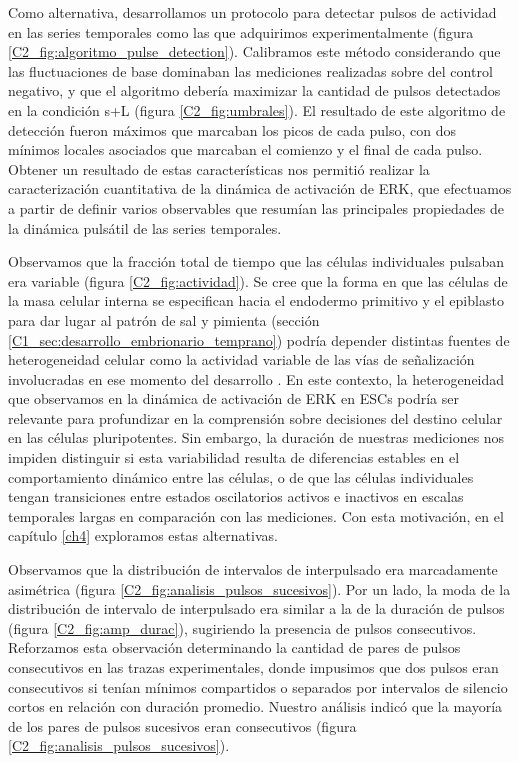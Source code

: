 \documentclass[./main.tex]{subfiles}
\begin{document}
Como alternativa, desarrollamos un protocolo para detectar pulsos de actividad en las series temporales como las que adquirimos experimentalmente (figura \ref{C2_fig:algoritmo_pulse_detection}). Calibramos este método considerando que las fluctuaciones de base dominaban las mediciones realizadas sobre del control negativo, y que el algoritmo debería maximizar la cantidad de pulsos detectados en la condición s+L (figura \ref{C2_fig:umbrales}). El resultado de este algoritmo de detección fueron máximos que marcaban los picos de cada pulso, con dos mínimos locales asociados que marcaban el comienzo y el final de cada pulso. Obtener un resultado de estas características nos permitió realizar la caracterización cuantitativa de la dinámica de activación de ERK, que efectuamos a partir de definir varios observables que resumían las principales propiedades de la dinámica pulsátil de las series temporales. 


Observamos que la fracción total de tiempo que las células individuales pulsaban era variable (figura \ref{C2_fig:actividad}). Se cree que la forma en que las células de la masa celular interna se especifican hacia el endodermo primitivo y el epiblasto para dar lugar al patrón de sal y pimienta (sección \ref{C1_sec:desarrollo_embrionario_temprano}) podría depender distintas fuentes de heterogeneidad celular como la actividad variable de las vías de señalización involucradas en ese momento del desarrollo \cite{Pokrass2020,Saiz2016}. En este contexto, la heterogeneidad que observamos en la dinámica de activación de ERK en ESCs podría ser relevante para profundizar en la comprensión sobre decisiones del destino celular en las células pluripotentes. Sin embargo, la duración de nuestras mediciones nos impiden distinguir si esta variabilidad resulta de diferencias estables en el comportamiento dinámico entre las células, o de que las células individuales tengan transiciones entre estados oscilatorios activos e inactivos en escalas temporales largas en comparación con las mediciones. Con esta motivación, en el capítulo \ref{ch4} exploramos estas alternativas. 


Observamos que la distribución de intervalos de interpulsado era marcadamente asimétrica (figura \ref{C2_fig:analisis_pulsos_sucesivos}). Por un lado, la moda de la distribución de intervalo de interpulsado era similar a la de la duración de pulsos (figura \ref{C2_fig:amp_durac}), sugiriendo la presencia de pulsos consecutivos. Reforzamos esta observación determinando la cantidad de pares de pulsos consecutivos en las trazas experimentales, donde impusimos que dos pulsos eran consecutivos si tenían mínimos compartidos o separados por intervalos de silencio cortos en relación con duración promedio. Nuestro análisis indicó que la mayoría de los pares de pulsos sucesivos eran consecutivos (figura \ref{C2_fig:analisis_pulsos_sucesivos}).
\end{document}
